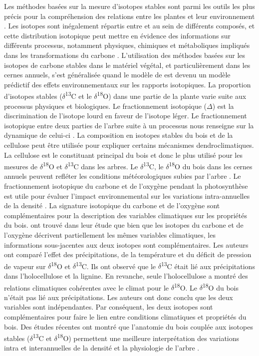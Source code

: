 \documentclass[a4paper,12pt]{report}
\newcommand{\Ctreize}{$\delta$\textsuperscript{13}C\xspace}
\newcommand{\Odixhuit}{$\delta$\textsuperscript{18}O\xspace}
\begin{document}
Les méthodes basées sur la mesure d'isotopes stables sont parmi les outils les plus précis pour la compréhension des relations entre les plantes et leur environnement \citep{Dawson2002}. Les isotopes sont inégalement répartis entre et au sein de différents composés, et cette distribution isotopique peut mettre en évidence des informations sur différents processus, notamment physiques, chimiques et métaboliques impliqués dans les transformations du carbone \citep{Farquhar1989}. L'utilisation des méthodes basées sur les isotopes de carbone stables dans le matériel végétal, et particulièrement dans les cernes annuels, s'est généralisée quand le modèle de \cite{Farquhar1989} est devenu un modèle prédictif des effets environnementaux sur les rapports isotopiques. La proportion d'isotopes stables (\Ctreize et le \Odixhuit) dans une partie de la plante varie suite aux processus physiques et biologiques. Le fractionnement isotopique ($\Delta$) est la discrimination de l'isotope lourd en faveur de l'isotope léger. Le fractionnement isotopique entre deux parties de l'arbre suite à un processus nous renseigne sur la dynamique de celui-ci \citep{Farquhar1989}. La composition en isotopes stables du bois et de la cellulose peut être utilisée pour expliquer certains mécanismes dendroclimatiques. La cellulose est le constituant principal du bois et donc le plus utilisé pour les mesures de \Odixhuit et \Ctreize dans les arbres. Le \Ctreize, le \Odixhuit du bois dans les cernes annuels peuvent refléter les conditions météorologiques subies par l'arbre \citep{Duquesnay1998,McCarroll2004,Hartl-meier2015}. Le fractionnement isotopique du carbone et de l'oxygène pendant la photosynthèse est utile pour évaluer l'impact environnemental sur les variations intra-annuelles de la densité \citep{Farquhar1989,JonLloyd1994}. La signature isotopique du carbone et de l'oxygène sont complémentaires pour la description des variables climatiques sur les propriétés du bois. \cite{FERRIO2005} ont trouvé dans leur étude que bien que les isotopes du carbone et de l'oxygène décrivent partiellement les mêmes variables climatiques, les informations sous-jacentes aux deux isotopes sont complémentaires. Les auteurs ont comparé l'effet des précipitations, de la température et du déficit de pression de vapeur sur \Odixhuit et \Ctreize. Ils ont observé que le \Ctreize était lié aux précipitations dans l'holocellulose et la lignine. En revanche, seule l'holocellulose a montré des relations climatiques cohérentes avec le climat pour le \Odixhuit. Le \Odixhuit du bois n'était pas lié aux précipitations. Les auteurs ont donc conclu que les deux variables sont indépendantes. Par conséquent, les deux isotopes sont complémentaires pour faire le lien entre conditions climatiques et propriétés du bois. Des études récentes ont montré que l'anatomie du bois couplée aux isotopes stables (\Ctreize et \Odixhuit) permettent une meilleure interprétation des variations intra et interannuelles de la densité et la physiologie de l'arbre \citep{Micco2007,Vaganov2009,Sarris2013}. \\ 
\end{document}
